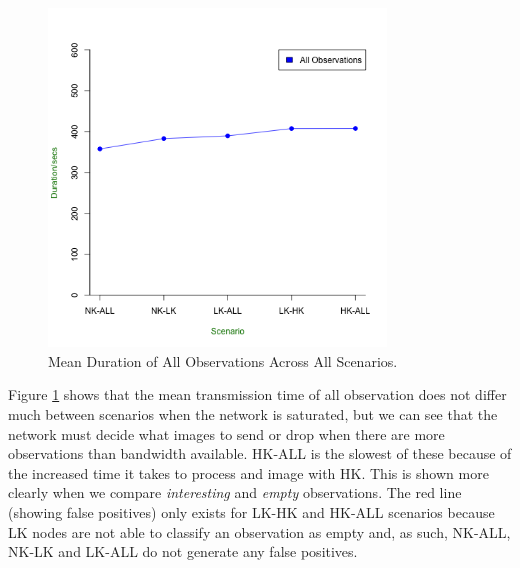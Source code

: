 	\begin{figure}[h]
	\centering
	\includegraphics[width=0.8\textwidth]{Chap7/figures/saturated/total_dur}
	\caption{Mean Duration of All Observations Across All Scenarios.}
	\label{fig:sat:total:dur}
	\end{figure}

Figure \ref{fig:sat:total:dur} shows that the mean transmission time of all observation does not differ much between scenarios when the network is saturated, but we can see that the network must decide what images to send or drop when there are more observations than bandwidth available. HK-ALL is the slowest of these because of the increased time it takes to process and image with HK. This is shown more clearly when we compare \textit{interesting} and \textit{empty} observations. The red line (showing false positives) only exists for LK-HK and HK-ALL scenarios because LK nodes are not able to classify an observation as empty and, as such, NK-ALL, NK-LK and LK-ALL do not generate any false positives.

